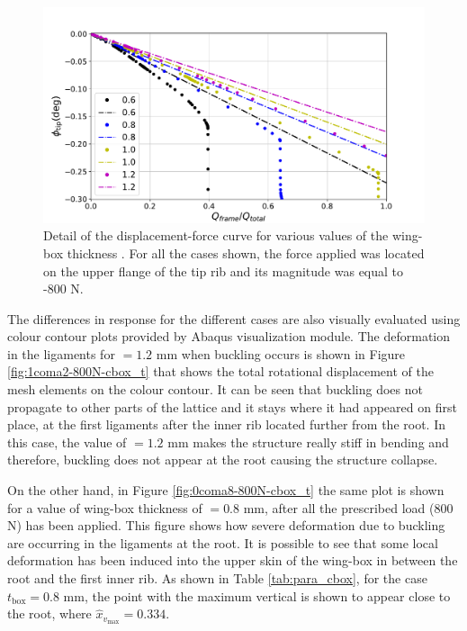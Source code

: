     \begin{figure}[!htpb] %
      \centering
      \includegraphics[width=0.8 \textwidth]{figures/../figures/result-sim/cbox/force_displacement-close}
      \caption[Detail of the displacement-force curve for various values of the wing-box thickness]{Detail of the displacement-force curve for various values of the wing-box thickness \boxt. For all the cases shown, the force applied was located on the upper flange of the tip rib and its magnitude was equal to -800 N.}\label{fig:forceDisplacement-close-Cbox_t}
    \end{figure}

    The differences in response for the different cases are also visually evaluated using colour contour plots provided by Abaqus visualization module. The deformation in the ligaments for \boxt$= 1.2$ mm when buckling occurs is shown in Figure \ref{fig:1coma2-800N-cbox_t} that shows the total rotational displacement of the mesh elements on the colour contour. It can be seen that buckling does not propagate to other parts of the lattice and it stays where it had appeared on first place, at the first ligaments after the inner rib located further from the root. In this case, the value of \boxt$= 1.2$ mm makes the structure really stiff in bending and therefore, buckling does not appear at the root causing the structure collapse.

    On the other hand, in Figure \ref{fig:0coma8-800N-cbox_t} the same plot is shown for a value of wing-box thickness of \boxt$= 0.8$ mm, after all the prescribed load (800 N) has been applied. This figure shows how severe deformation due to buckling are occurring in the ligaments at the root. It is possible to see that some local deformation has been induced into the upper skin of the wing-box in between the root and the first inner rib. As shown in Table \ref{tab:para_cbox}, for the case $t_{\mathrm{box}} = 0.8$ mm, the point with the maximum vertical is shown to appear close to the root, where $\hat{x}_{v_{\mathrm{max}}} = 0.334$.

